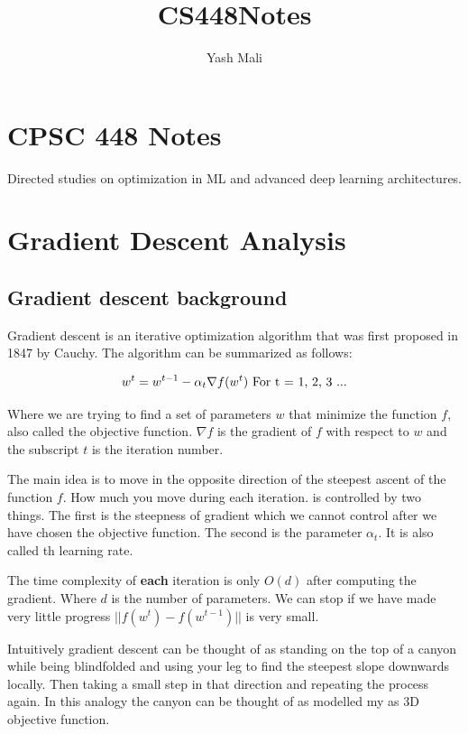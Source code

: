 \documentclass[
]{article}
\title{CS448Notes}
\author{Yash Mali}
\date{}
\begin{document}
\maketitle

{
\setcounter{tocdepth}{2}
\tableofcontents
}
\section{CPSC 448 Notes}\label{cpsc-448-notes}

Directed studies on optimization in ML and advanced deep learning architectures.

\section{Gradient Descent Analysis}\label{gradient-descent-analysis}

\subsection{Gradient descent background}\label{gradient-descent-background}

Gradient descent is an iterative optimization algorithm that was first proposed in 1847 by Cauchy. The algorithm can be summarized as follows:

\[
w^t = w^{t-1} - \alpha_t \nabla f(w^t) \\
\text{  For t = 1, 2, 3 ...}
\]

Where we are trying to find a set of parameters \(w\) that minimize the function \(f\), also called the objective function. \(\nabla f\) is the gradient of \(f\) with respect to \(w\) and the subscript \(t\) is the iteration number.

The main idea is to move in the opposite direction of the steepest ascent of the function \(f\). How much you move during each iteration. is controlled by two things. The first is the steepness of gradient which we cannot control after we have chosen the objective function. The second is the parameter \(\alpha_t\). It is also called th learning rate.

The time complexity of \textbf{each} iteration is only \(O(d)\) after computing the gradient. Where \(d\) is the number of parameters. We can stop if we have made very little progress \(||f(w^t) - f(w^{t-1})||\) is very small.

Intuitively gradient descent can be thought of as standing on the top of a canyon while being blindfolded and using your leg to find the steepest slope downwards locally. Then taking a small step in that direction and repeating the process again. In this analogy the canyon can be thought of as modelled my as 3D objective function.
\end{document}
